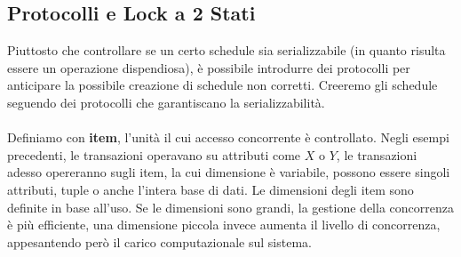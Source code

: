 \documentclass[12pt, letterpaper]{article}
\newcommand{\acc}{\\\hphantom{}\\}
\begin{document}
\subsection{Protocolli e Lock a 2 Stati}
Piuttosto che controllare se un certo schedule sia serializzabile (in quanto risulta essere un operazione dispendiosa), è 
possibile introdurre dei protocolli per anticipare la possibile creazione di schedule non corretti. Creeremo gli schedule 
seguendo dei protocolli che garantiscano la serializzabilità.\acc Definiamo con \textbf{item}, l'unità 
il cui accesso concorrente è controllato. Negli esempi precedenti, le transazioni operavano su attributi come \(X\) o \(Y\), 
le transazioni adesso opereranno sugli item, la cui dimensione è variabile, possono essere singoli attributi, tuple o anche 
l'intera base di dati. Le dimensioni degli item sono definite in base all'uso. Se le dimensioni sono grandi, la gestione della 
concorrenza è più efficiente, una dimensione piccola invece aumenta il livello di concorrenza, appesantendo però il carico 
computazionale sul sistema.
\end{document}
